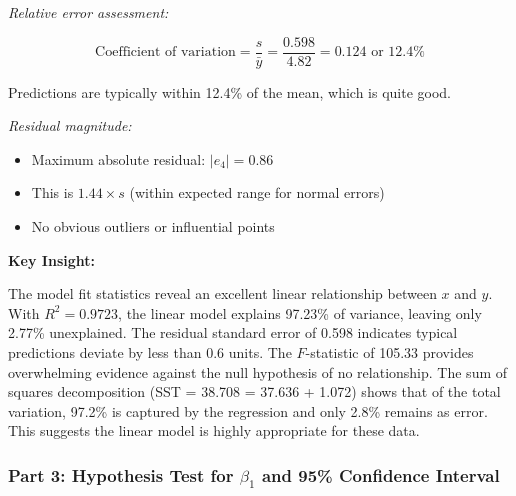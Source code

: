 \documentclass[12pt]{article}
\begin{document}
\begin{explanation}
\textit{Relative error assessment:}

\[
\text{Coefficient of variation} = \frac{s}{\bar{y}} = \frac{0.598}{4.82} = 0.124 \text{ or } 12.4\%
\]

Predictions are typically within 12.4\% of the mean, which is quite good.

\textit{Residual magnitude:}

\begin{itemize}
    \item Maximum absolute residual: $|e_4| = 0.86$
    \item This is $1.44 \times s$ (within expected range for normal errors)
    \item No obvious outliers or influential points
\end{itemize}

\textbf{Key Insight:}

The model fit statistics reveal an excellent linear relationship between $x$ and $y$. With $R^2 = 0.9723$, the linear model explains 97.23\% of variance, leaving only 2.77\% unexplained. The residual standard error of 0.598 indicates typical predictions deviate by less than 0.6 units. The $F$-statistic of 105.33 provides overwhelming evidence against the null hypothesis of no relationship. The sum of squares decomposition (SST = 38.708 = 37.636 + 1.072) shows that of the total variation, 97.2\% is captured by the regression and only 2.8\% remains as error. This suggests the linear model is highly appropriate for these data.
\end{explanation}

\subsubsection{Part 3: Hypothesis Test for $\beta_1$ and 95\% Confidence Interval}
\end{document}
